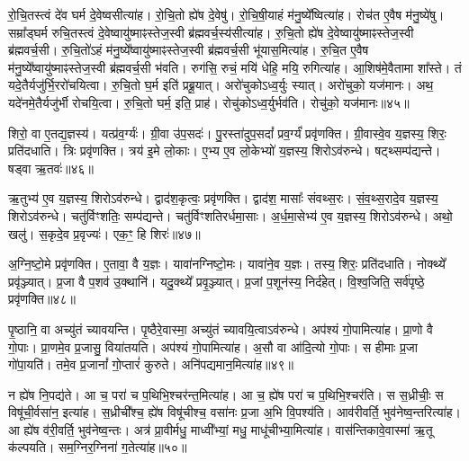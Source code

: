 रो॒चि॒तस्त्वं दे॑व घर्म दे॒वेष्वसीत्या॑ह। 
रो॒चि॒तो ह्ये॑ष दे॒वेषु॑। 
रो॒चि॒षी॒याहं म॑नु॒ष्ये᳚ष्वित्या॑ह। 
रोच॑त ए॒वैष म॑नु॒ष्ये॑षु। 
सम्रा᳚ड्घर्म रुचि॒तस्त्वं दे॒वेष्वायु॑ष्माꣴस्तेज॒स्वी ब्र॑ह्मवर्च॒स्य॑सीत्या॑ह। 
रु॒चि॒तो ह्ये॑ष दे॒वेष्वायु॑ष्माꣴस्तेज॒स्वी ब्र॑ह्मवर्च॒सी। 
रु॒चि॒तो॑ऽहं म॑नु॒ष्ये᳚ष्वायु॑ष्माꣴस्तेज॒स्वी ब्र॑ह्मवर्च॒सी भू॑यास॒मित्या॑ह। 
रु॒चि॒त ए॒वैष म॑नु॒ष्ये᳚ष्वायु॑ष्माꣴस्तेज॒स्वी ब्र॑ह्मवर्च॒सी भ॑वति। 
रुग॑सि॒ रुचं॒ मयि॑ धेहि॒ मयि॒ रुगित्या॑ह। 
आ॒शिष॑मे॒वैतामा शा᳚स्ते। 
तं यदे॒तैर्यजु॑र्भि॒ररो॑चयित्वा। 
रु॒चि॒तो घ॒र्म इति॑ प्रब्रू॒यात्। 
अरो॑चुकोऽध्व॒र्युः स्यात्। 
अरो॑चुको॒ यज॑मानः। 
अथ॒ यदे॑नमे॒तैर्यजु॑र्भी रोचयि॒त्वा। 
रु॒चि॒तो घर्म॒ इति॒ प्राह॑। 
रोचु॑कोऽध्व॒र्युर्भव॑ति। 
रोचु॑को॒ यज॑मानः॥४५॥
\anuvakamend[प॒श्चाद्रो॑चयति॒ जाग॑तेन॒ छन्द॑सा॒ पाङ्क्ते॑न॒ छन्द॑सा॒ स मा॑ रुचि॒तो रो॑च॒येत्या॑हा॒शिष॑मे॒वैतामाशा᳚स्ते शास्ते॒ऽष्टौ च॑]

शिरो॒ वा ए॒तद्य॒ज्ञस्य॑। 
यत्प्र॑व॒र्ग्यः॑। 
ग्री॒वा उ॑प॒सदः॑। 
पु॒रस्ता॑दुप॒सदां᳚ प्रव॒र्ग्यं॑ प्रवृ॑णक्ति। 
ग्री॒वास्वे॒व य॒ज्ञस्य॒ शिरः॒ प्रति॑दधाति। 
त्रिः प्रवृ॑णक्ति। 
त्रय॑ इ॒मे लो॒काः। 
ए॒भ्य ए॒व लो॒केभ्यो॑ य॒ज्ञस्य॒ शिरोऽव॑रुन्धे। 
षट्थ्सम्प॑द्यन्ते। 
षड्वा ऋ॒तवः॑॥४६॥

ऋ॒तुभ्य॑ ए॒व य॒ज्ञस्य॒ शिरोऽव॑रुन्धे। 
द्वाद॑श॒कृत्वः॒ प्रवृ॑णक्ति। 
द्वाद॑श॒ मासाः᳚ संवथ्स॒रः। 
सं॒व॒थ्स॒रादे॒व य॒ज्ञस्य॒ शिरोऽव॑रुन्धे। 
चतु॑र्विꣳशतिः॒ सम्प॑द्यन्ते। 
चतु॑र्विꣳशतिरर्धमा॒साः। 
अ॒र्ध॒मा॒सेभ्य॑ ए॒व य॒ज्ञस्य॒ शिरोऽव॑रुन्धे। 
अथो॒ खलु॑। 
स॒कृदे॒व प्र॒वृज्यः॑। 
एक॒ꣳ॒ हि शिरः॑॥४७॥

अ॒ग्नि॒ष्टो॒मे प्रवृ॑णक्ति। 
ए॒तावा॒\an{} वै य॒ज्ञः। 
यावा॑नग्निष्टो॒मः। 
यावा॑ने॒व य॒ज्ञः। 
तस्य॒ शिरः॒ प्रति॑दधाति। 
नोक्थ्ये᳚ प्रवृ॑ञ्ज्यात्। 
प्र॒जा वै प॒शव॑ उ॒क्थानि॑। 
यदु॒क्थ्ये᳚ प्रवृ॒ञ्ज्यात्। 
प्र॒जां प॒शून॑स्य॒ निर्द॑हेत्। 
वि॒श्व॒जिति॒ सर्व॑पृष्ठे॒ प्रवृ॑णक्ति॥४८॥

पृ॒ष्ठानि॒ वा अच्यु॑तं च्यावयन्ति। 
पृ॒ष्ठैरे॒वास्मा॒ अच्यु॑तं च्यावयि॒त्वाऽव॑रुन्धे। 
अप॑श्यं गो॒पामित्या॑ह। 
प्रा॒णो वै गो॒पाः। 
प्रा॒णमे॒व प्र॒जासु॒ विया॑तयति। 
अप॑श्यं गो॒पामित्या॑ह। 
अ॒सौ वा आ॑दि॒त्यो गो॒पाः। 
स हीमाः प्र॒जा गो॑पा॒यति॑। 
तमे॒व प्र॒जानां᳚ गो॒प्तारं॑ कुरुते। 
अनि॑पद्यमान॒मित्या॑ह॥४९॥

न ह्ये॑ष नि॒पद्य॑ते। 
आ च॒ परा॑ च प॒थिभि॒श्चर॑न्त॒मित्या॑ह। 
आ च॒ ह्ये॑ष परा॑ च प॒थिभि॒श्चर॑ति। 
स स॒ध्रीचीः॒ स विषू॑ची॒र्वसा॑न॒ इत्या॑ह। 
स॒ध्रीची᳚श्च॒ ह्ये॑ष विषू॑चीश्च॒ वसा॑नः प्र॒जा अ॒भि वि॒पश्य॑ति। 
आव॑रीवर्ति॒ भुव॑नेष्व॒न्तरित्या॑ह। 
आ ह्ये॑ष व॑री॒वर्ति॒ भुव॑नेष्व॒न्तः। 
अत्र॑ प्रा॒वीर्मधु॒ माध्वी᳚भ्यां॒ मधु॒ माधू॑चीभ्या॒मित्या॑ह। 
वास॑न्तिकावे॒वास्मा॑ ऋ॒तू क॑ल्पयति। 
सम॒ग्निर॒ग्निना॑ ग॒तेत्या॑ह॥५०॥

